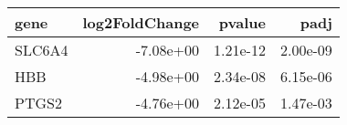\begin{tabular}{lrrr}
\toprule
  gene &  log2FoldChange &   pvalue &     padj \\
\midrule
SLC6A4 &       -7.08e+00 & 1.21e-12 & 2.00e-09 \\
   HBB &       -4.98e+00 & 2.34e-08 & 6.15e-06 \\
 PTGS2 &       -4.76e+00 & 2.12e-05 & 1.47e-03 \\
\bottomrule
\end{tabular}
